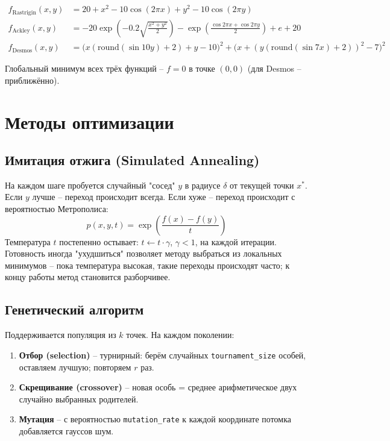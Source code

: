 \documentclass[12pt,a4paper]{article}
\begin{document}
\begin{align}
f_{\mathrm{Rastrigin}}(x,y) &= 20 + x^2-10\cos(2\pi x) + y^2-10\cos(2\pi y) \\
f_{\mathrm{Ackley}}(x,y) &= -20\exp\!\left(-0.2\sqrt{\tfrac{x^2+y^2}{2}}\right)
    -\exp\!\left(\tfrac{\cos2\pi x+\cos2\pi y}{2}\right)+e+20 \\
f_{\mathrm{Desmos}}(x,y) &= \big(x(\mathrm{round}(\sin10y)+2)+y-10\big)^2
    + \big(x+(y(\mathrm{round}(\sin7x)+2))^2-7\big)^2
\end{align}

Глобальный минимум всех трёх функций -- $f=0$ в точке $(0,0)$ (для
Desmos -- приближённо).

\section{Методы оптимизации}

\subsection{Имитация отжига (Simulated Annealing)}

На каждом шаге пробуется случайный "сосед" $y$ в радиусе $\delta$ от
текущей точки $x^*$. Если $y$ лучше -- переход происходит всегда. Если
хуже -- переход происходит с вероятностью Метрополиса:
\begin{equation}
    p(x,y,t) = \exp\!\left(\frac{f(x)-f(y)}{t}\right)
\end{equation}
Температура $t$ постепенно остывает: $t \leftarrow t\cdot\gamma$,
$\gamma<1$, на каждой итерации. Готовность иногда "ухудшиться" позволяет
методу выбраться из локальных минимумов -- пока температура высокая,
такие переходы происходят часто; к концу работы метод становится
разборчивее.

\subsection{Генетический алгоритм}

Поддерживается популяция из $k$ точек. На каждом поколении:
\begin{enumerate}
    \item \textbf{Отбор (selection)} -- турнирный: берём случайных
    \texttt{tournament\_size} особей, оставляем лучшую; повторяем $r$ раз.
    \item \textbf{Скрещивание (crossover)} -- новая особь = среднее
    арифметическое двух случайно выбранных родителей.
    \item \textbf{Мутация} -- с вероятностью \texttt{mutation\_rate} к
    каждой координате потомка добавляется гауссов шум.
\end{enumerate}
\end{document}
